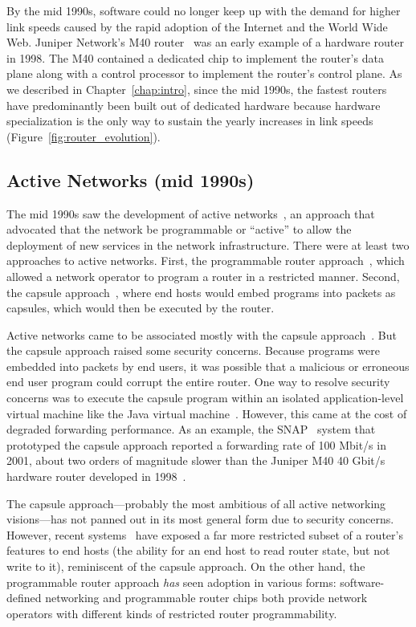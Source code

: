By the mid 1990s, software could no longer keep up with the demand for higher
link speeds caused by the rapid adoption of the Internet and the World Wide
Web. Juniper Network's M40 router~\cite{m40} was an early example of a hardware
router in 1998.  The M40 contained a dedicated chip to implement the router's
data plane along with a control processor to implement the router's control
plane. As we described in Chapter~\ref{chap:intro}, since the mid 1990s, the
fastest routers have predominantly been built out of dedicated hardware because
hardware specialization is the only way to sustain the yearly increases in link
speeds (Figure~\ref{fig:router_evolution}).

\subsection{Active Networks (mid 1990s)}
The mid 1990s saw the development of active networks~\cite{ants, switchware}, an
approach that advocated that the network be programmable or ``active'' to allow
the deployment of new services in the network infrastructure. There were at
least two approaches to active networks. First, the programmable router
approach~\cite{switchware}, which allowed a network operator to program a
router in a restricted manner. Second, the capsule approach~\cite{ants,
wetherall_thesis, anet_retrospective}, where end hosts would embed programs
into packets as capsules, which would then be executed by the router.

Active networks came to be associated mostly with the capsule
approach~\cite{sdn_history}. But the capsule approach raised some security
concerns. Because programs were embedded into packets by end users, it was
possible that a malicious or erroneous end user program could corrupt the
entire router.  One way to resolve security concerns was to execute the capsule
program within an isolated application-level virtual machine like the Java
virtual machine~\cite{ants, wetherall_thesis, anet_retrospective}. However,
this came at the cost of degraded forwarding performance. As an example, the
SNAP~\cite{snap_active_packets} system that prototyped the capsule approach
reported a forwarding rate of 100 Mbit/s in 2001, about two orders of magnitude
slower than the Juniper M40 40 Gbit/s hardware router developed in
1998~\cite{m40}.

The capsule approach---probably the most ambitious of all active networking
visions---has not panned out in its most general form due to security concerns.
However, recent systems~\cite{int} have exposed a far more restricted subset of
a router's features to end hosts (\eg the ability for an end host to read
router state, but not write to it), reminiscent of the capsule approach.  On
the other hand, the programmable router approach {\em has} seen adoption in
various forms: software-defined networking and programmable router chips both
provide network operators with different kinds of restricted router
programmability.

